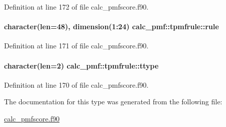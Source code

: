 Definition at line 172 of file calc\-\_\-pmfscore.\-f90.

\hypertarget{structcalc__pmf_1_1tpmfrule_a98c2d224034c7aac9c447e70f5d6d3ac}{
\paragraph[{rule}]{\setlength{\rightskip}{0pt plus 5cm}character(len=48), dimension(1\-:24) calc\-\_\-pmf\-::tpmfrule\-::rule}}\label{structcalc__pmf_1_1tpmfrule_a98c2d224034c7aac9c447e70f5d6d3ac}


Definition at line 171 of file calc\-\_\-pmfscore.\-f90.

\hypertarget{structcalc__pmf_1_1tpmfrule_a9c140db31e9b6eb044ac210895bb6e67}{
\paragraph[{ttype}]{\setlength{\rightskip}{0pt plus 5cm}character(len=2) calc\-\_\-pmf\-::tpmfrule\-::ttype}}\label{structcalc__pmf_1_1tpmfrule_a9c140db31e9b6eb044ac210895bb6e67}


Definition at line 170 of file calc\-\_\-pmfscore.\-f90.



The documentation for this type was generated from the following file\-:\begin{DoxyCompactItemize}
\item 
\hyperlink{calc__pmfscore_8f90}{calc\-\_\-pmfscore.\-f90}\end{DoxyCompactItemize}
